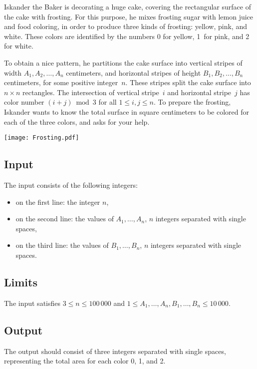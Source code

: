 
\noindent
Iskander the Baker is decorating a huge cake, covering the rectangular
surface of the cake with frosting.  For this purpose, he mixes frosting
sugar with lemon juice and food coloring, in order to produce three kinds of
frosting: yellow, pink, and white. These colors are identified by the
numbers 0 for yellow, 1~for pink, and 2 for white.

To obtain a nice pattern, he partitions the cake surface into
vertical stripes of width $A_1, A_2, \dots, A_n$ centimeters, and
horizontal stripes of height $B_1, B_2, \dots, B_n$ centimeters, for
some positive integer~$n$. These stripes split the cake surface
into $n\times n$ rectangles. The intersection of vertical stripe~$i$ and
horizontal stripe~$j$ has color number $(i+j) \bmod 3$ for all $1 \leq
i,j \leq n$. To prepare
the frosting, Iskander wants to know the total surface in square
centimeters to be colored for each of the three colors, and asks for your
help.

\begin{center}
\texttt{[image: Frosting.pdf]}
\end{center}

\subsection*{Input}

The input consists of the following integers:
\begin{itemize}
\item on the first line: the integer $n$,
\item on the second line: the values of $A_1,\dots,A_n$, $n$ integers
  separated with single spaces,
\item on the third line: the values of $B_1,\dots,B_n$, $n$ integers separated with 
  single spaces.
\end{itemize}

\subsection*{Limits}

The input satisfies $3\leq n \leq 100\,000$ and
$1 \leq A_1,\ldots,A_n,B_1,\ldots,B_n \leq 10\,000$.

\subsection*{Output}

The output should consist of three integers separated
with single spaces,
representing the total area for each color 0, 1, and 2.

\clearpage
